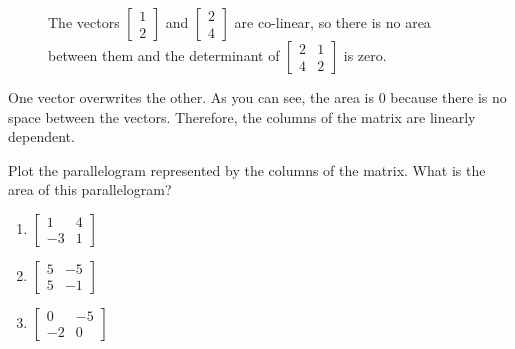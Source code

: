 \begin{figure}[htbp]
    \centering
    \caption{The vectors $\begin{bmatrix} 1\\2 \end{bmatrix}$ and 
    $\begin{bmatrix} 2\\4 \end{bmatrix}$ are co-linear, so there is no area 
    between them and the determinant of $\begin{bmatrix} 2 & 1\\ 4 & 2 
    \end{bmatrix}$ is zero.}
    \label{fig:zero_det}
\end{figure}

One vector overwrites the other. As you can see, the area is 0 because there 
is no space between the vectors. Therefore, the columns of the matrix are 
linearly dependent.

\begin{Exercise}[title = {Finding the Determinate}, label = geo_det]
Plot the parallelogram represented by the columns of the matrix. What is the 
area of this parallelogram?
\begin{enumerate}
\item $\begin{bmatrix}
1 &4\\
-3 & 1
\end{bmatrix}$
\item $\begin{bmatrix}
5 & -5 \\
5 & -1
\end{bmatrix}$
\item $\begin{bmatrix}
0 & -5 \\
-2 & 0 
\end{bmatrix}$
\end{enumerate}
\end{Exercise}

